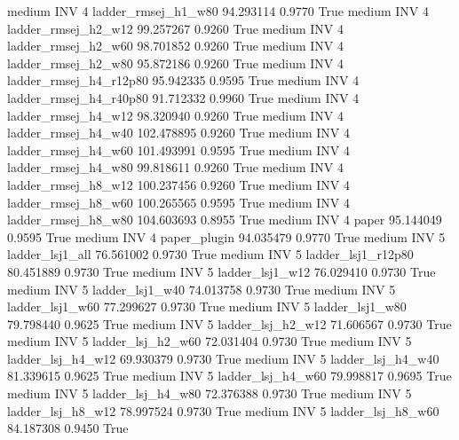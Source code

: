     medium      INV                 4    ladder_rmsej_h1_w80  94.293114      0.9770    True
    medium      INV                 4    ladder_rmsej_h2_w12  99.257267      0.9260    True
    medium      INV                 4    ladder_rmsej_h2_w60  98.701852      0.9260    True
    medium      INV                 4    ladder_rmsej_h2_w80  95.872186      0.9260    True
    medium      INV                 4 ladder_rmsej_h4_r12p80  95.942335      0.9595    True
    medium      INV                 4 ladder_rmsej_h4_r40p80  91.712332      0.9960    True
    medium      INV                 4    ladder_rmsej_h4_w12  98.320940      0.9260    True
    medium      INV                 4    ladder_rmsej_h4_w40 102.478895      0.9260    True
    medium      INV                 4    ladder_rmsej_h4_w60 101.493991      0.9595    True
    medium      INV                 4    ladder_rmsej_h4_w80  99.818611      0.9260    True
    medium      INV                 4    ladder_rmsej_h8_w12 100.237456      0.9260    True
    medium      INV                 4    ladder_rmsej_h8_w60 100.265565      0.9595    True
    medium      INV                 4    ladder_rmsej_h8_w80 104.603693      0.8955    True
    medium      INV                 4                  paper  95.144049      0.9595    True
    medium      INV                 4           paper_plugin  94.035479      0.9770    True
    medium      INV                 5        ladder_lsj1_all  76.561002      0.9730    True
    medium      INV                 5     ladder_lsj1_r12p80  80.451889      0.9730    True
    medium      INV                 5        ladder_lsj1_w12  76.029410      0.9730    True
    medium      INV                 5        ladder_lsj1_w40  74.013758      0.9730    True
    medium      INV                 5        ladder_lsj1_w60  77.299627      0.9730    True
    medium      INV                 5        ladder_lsj1_w80  79.798440      0.9625    True
    medium      INV                 5      ladder_lsj_h2_w12  71.606567      0.9730    True
    medium      INV                 5      ladder_lsj_h2_w60  72.031404      0.9730    True
    medium      INV                 5      ladder_lsj_h4_w12  69.930379      0.9730    True
    medium      INV                 5      ladder_lsj_h4_w40  81.339615      0.9625    True
    medium      INV                 5      ladder_lsj_h4_w60  79.998817      0.9695    True
    medium      INV                 5      ladder_lsj_h4_w80  72.376388      0.9730    True
    medium      INV                 5      ladder_lsj_h8_w12  78.997524      0.9730    True
    medium      INV                 5      ladder_lsj_h8_w60  84.187308      0.9450    True
